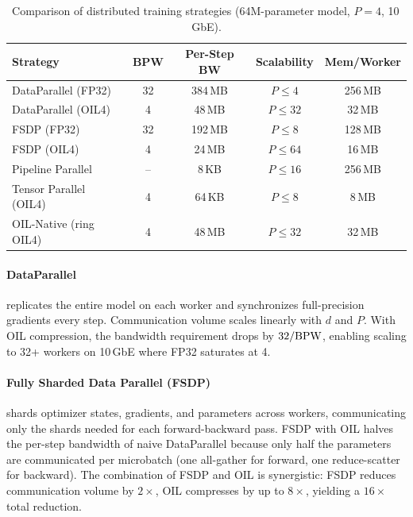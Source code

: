 \begin{table}[H]
\centering
\caption{Comparison of distributed training strategies (64M-parameter model, $P = 4$, 10\,GbE).}
\label{tab:dist_strategies}
\begin{tabular}{lcccc}
\toprule
\textbf{Strategy} & \textbf{BPW} & \textbf{Per-Step BW} & \textbf{Scalability} & \textbf{Mem/Worker} \\
\midrule
DataParallel (FP32)       & 32 & 384\,MB & $P \leq 4$  & 256\,MB \\
DataParallel (OIL4)       &  4 &  48\,MB & $P \leq 32$ &  32\,MB \\
FSDP (FP32)               & 32 & 192\,MB & $P \leq 8$  & 128\,MB \\
FSDP (OIL4)               &  4 &  24\,MB & $P \leq 64$ &  16\,MB \\
Pipeline Parallel         & -- &  8\,KB  & $P \leq 16$ & 256\,MB \\
Tensor Parallel (OIL4)    &  4 &  64\,KB & $P \leq 8$  &   8\,MB \\
OIL-Native (ring OIL4)    &  4 &  48\,MB & $P \leq 32$ &  32\,MB \\
\bottomrule
\end{tabular}
\end{table}

\paragraph{DataParallel} replicates the entire model on each worker and synchronizes full-precision gradients every step. Communication volume scales linearly with $d$ and $P$. With OIL compression, the bandwidth requirement drops by $32/\textnormal{BPW}$, enabling scaling to 32+ workers on 10\,GbE where FP32 saturates at 4.

\paragraph{Fully Sharded Data Parallel (FSDP)} shards optimizer states, gradients, and parameters across workers, communicating only the shards needed for each forward-backward pass. FSDP with OIL halves the per-step bandwidth of naive DataParallel because only half the parameters are communicated per microbatch (one all-gather for forward, one reduce-scatter for backward). The combination of FSDP and OIL is synergistic: FSDP reduces communication volume by $2\times$, OIL compresses by up to $8\times$, yielding a $16\times$ total reduction.

